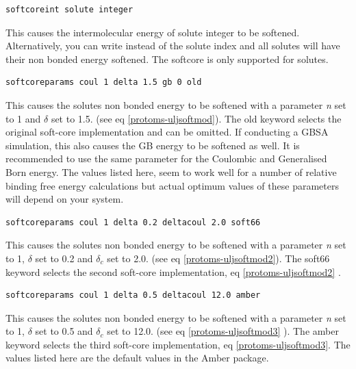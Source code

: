 \documentclass[letterpaper,10pt,english]{sphinxmanual}
\begin{document}
\begin{Verbatim}[commandchars=\\\{\}]
softcoreint solute integer
\end{Verbatim}

This causes the intermolecular energy of solute integer to be softened. Alternatively, you can write  instead of the solute index and all solutes will have their non bonded energy softened. The softcore is only supported for solutes.

\begin{Verbatim}[commandchars=\\\{\}]
softcoreparams coul 1 delta 1.5 gb 0 old
\end{Verbatim}

This causes the solutes non bonded energy to be softened with a parameter \emph{n} set to 1 and \(\delta\) set to 1.5. (see eq \eqref{protoms-uljsoftmod}). The old keyword selects the original soft-core implementation and can be omitted. If conducting a GBSA simulation, this also causes the GB energy to be softened as well. It is recommended to use the same parameter for the Coulombic and Generalised Born energy. The values listed here, seem to work well for a number of relative binding free energy calculations but actual optimum values of these parameters will depend on your system.

\begin{Verbatim}[commandchars=\\\{\}]
softcoreparams coul 1 delta 0.2 deltacoul 2.0 soft66
\end{Verbatim}

This causes the solutes non bonded energy to be softened with a parameter \emph{n} set to 1, \(\delta\) set to 0.2 and \(\delta_c\) set to 2.0. (see eq \eqref{protoms-uljsoftmod2}). The soft66 keyword selects the second soft-core implementation, eq \eqref{protoms-uljsoftmod2} .

\begin{Verbatim}[commandchars=\\\{\}]
softcoreparams coul 1 delta 0.5 deltacoul 12.0 amber
\end{Verbatim}

This causes the solutes non bonded energy to be softened with a parameter \emph{n} set to 1, \(\delta\) set to 0.5 and \(\delta_c\)  set to 12.0. (see eq \eqref{protoms-uljsoftmod3} ). The amber keyword selects the third soft-core implementation, eq \eqref{protoms-uljsoftmod3}. The values listed here are the default values in the Amber package.
\end{document}
